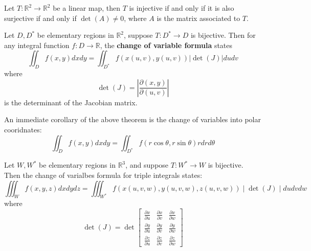 \documentclass[openany]{book}
\newcommand{\R}{\mathbb{R}}
\begin{document}
\begin{prop}
    Let $T:\R^2\to\R^2$ be a linear map, then $T$ is injective if and only if it is also surjective if and only if $\det(A)\neq 0$, where $A$ is the matrix associated to $T$.
\end{prop}


\begin{thm}
    Let $D,D^*$ be elementary regions in $\R^2$, suppose $T:D^*\to D$ is bijective. Then for any integral function $f:D\to\R$, the \textbf{change of variable formula} states
    \begin{equation*}
        \iint_Df(x,y)dxdy=\iint_{D^*}f(x(u,v),y(u,v))\left|\det(J)\right|dudv
    \end{equation*}
    where 
    \begin{equation*}
        \det(J)=\left|\frac{\partial(x,y)}{\partial(u,v)}\right|
    \end{equation*}
    is the determinant of the Jacobian matrix.
\end{thm}

\begin{cor}
    An immediate corollary of the above theorem is the change of variables into polar cooridnates:
    \begin{equation*}
        \iint_Df(x,y)dxdy=\iint_{D^*}f(r\cos\theta,r\sin\theta)rdrd\theta
    \end{equation*}
\end{cor}

\begin{cor}
    Let $W,W^*$ be elementary regions in $\R^3$, and suppose $T:W^*\to W$ is bijective. Then the change of varialbes formula for triple integrals states:
    \begin{equation*}
        \iiint_Wf(x,y,z)dxdydz=\iiint_{W^*}f(x(u,v,w), y(u,v,w), z(u,v,w))\mid\det(J)\mid dudvdw
    \end{equation*}
    where 
    \begin{equation*}
        \det(J)=\det\begin{bmatrix}
            \frac{\partial x}{\partial u}&\frac{\partial x}{\partial v}&\frac{\partial x}{\partial w}\\
            \frac{\partial y}{\partial u}&\frac{\partial y}{\partial v}&\frac{\partial y}{\partial w}\\
            \frac{\partial z}{\partial u}&\frac{\partial z}{\partial v}&\frac{\partial z}{\partial w}
        \end{bmatrix}
    \end{equation*}
\end{cor}
\end{document}
